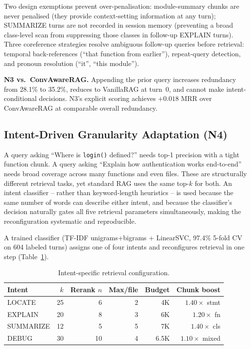 \documentclass[conference]{IEEEtran}
\begin{document}
Two design exemptions prevent over-penalisation: module-summary chunks are
never penalised (they provide context-setting information at any turn);
SUMMARIZE turns are not recorded in session memory (preventing a broad
class-level scan from suppressing those classes in follow-up EXPLAIN turns).
Three coreference strategies resolve ambiguous follow-up queries before
retrieval: temporal back-references (``that function from earlier''),
repeat-query detection, and pronoun resolution (``it'', ``this module'').

\textbf{N3 vs.\ ConvAwareRAG.} Appending the prior query increases redundancy
from 28.1\% to 35.2\%, reduces to VanillaRAG at turn~0, and cannot make
intent-conditional decisions. N3's explicit scoring achieves $+0.018$ MRR
over ConvAwareRAG at comparable overall redundancy.

\subsection{Intent-Driven Granularity Adaptation (N4)}

A query asking ``Where is \texttt{login()} defined?''
needs top-1 precision with a tight function chunk. A query asking ``Explain
how authentication works end-to-end'' needs broad coverage across many
functions and even files. These are structurally different retrieval tasks,
yet standard RAG uses the same top-$k$ for both. An intent
classifier -- rather than keyword-length heuristics -- is used because the
same number of words can describe either intent, and because the classifier's
decision naturally gates all five retrieval parameters simultaneously,
making the reconfiguration systematic and reproducible.

A trained classifier (TF-IDF unigrams+bigrams + LinearSVC, 97.4\% 5-fold
CV on 604 labeled turns) assigns one of four intents and reconfigures
retrieval in one step (Table~\ref{tab:intent_config}).

\begin{table}[t]
\centering
\caption{Intent-specific retrieval configuration.}
\label{tab:intent_config}
\footnotesize
\begin{tabular}{lrrrrr}
\toprule
Intent & $k$ & Rerank $n$ & Max/file & Budget & Chunk boost \\
\midrule
LOCATE    & 25 & 6  & 2 & 4K  & $1.40\times$ stmt \\
EXPLAIN   & 20 & 8  & 3 & 6K  & $1.20\times$ fn  \\
SUMMARIZE & 12 & 5  & 5 & 7K  & $1.40\times$ cls \\
DEBUG     & 30 & 10 & 4 & 6.5K& $1.10\times$ mixed \\
\bottomrule
\end{tabular}
\end{table}
\end{document}
